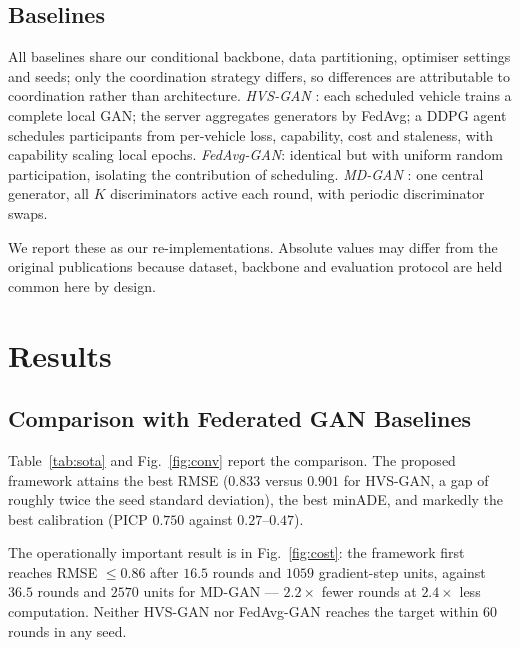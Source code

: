 \documentclass[journal]{IEEEtran}
\begin{document}

\subsection{Baselines}
\label{sec:baselines}
All baselines share our conditional backbone, data partitioning, optimiser
settings and seeds; only the coordination strategy differs, so differences are
attributable to coordination rather than architecture.
\emph{HVS-GAN} \cite{wu2024hvsgan}: each scheduled vehicle trains a complete
local GAN; the server aggregates generators by FedAvg; a DDPG agent schedules
participants from per-vehicle loss, capability, cost and staleness, with
capability scaling local epochs.
\emph{FedAvg-GAN}: identical but with uniform random participation, isolating
the contribution of scheduling.
\emph{MD-GAN} \cite{hardy2019mdgan}: one central generator, all $K$
discriminators active each round, with periodic discriminator swaps.


We report these as our re-implementations. Absolute values may differ from the
original publications because dataset, backbone and evaluation protocol are held
common here by design.

\section{Results}
\label{sec:results}

\subsection{Comparison with Federated GAN Baselines}
Table~\ref{tab:sota} and Fig.~\ref{fig:conv} report the comparison.
The proposed framework attains the best RMSE ($0.833$ versus $0.901$ for
HVS-GAN, a gap of roughly twice the seed standard deviation), the best minADE,
and markedly the best calibration (PICP $0.750$ against $0.27$--$0.47$).

The operationally important result is in Fig.~\ref{fig:cost}: the framework
first reaches RMSE $\leq 0.86$ after $16.5$ rounds and $1059$ gradient-step
units, against $36.5$ rounds and $2570$ units for MD-GAN --- $2.2\times$ fewer
rounds at $2.4\times$ less computation. Neither HVS-GAN nor FedAvg-GAN reaches
the target within $60$ rounds in any seed.
\end{document}
